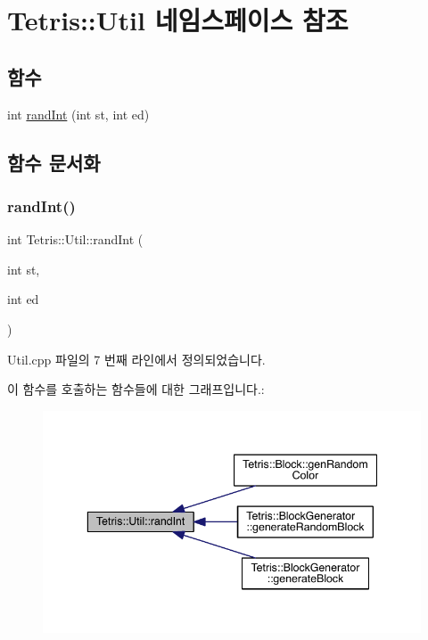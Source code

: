 \hypertarget{namespace_tetris_1_1_util}{}\section{Tetris\+:\+:Util 네임스페이스 참조}
\label{namespace_tetris_1_1_util}
\subsection*{함수}
\begin{DoxyCompactItemize}
\item 
int \hyperlink{namespace_tetris_1_1_util_aa590e9fd847ac6e0c9bc6bf464b5a74b}{rand\+Int} (int st, int ed)
\end{DoxyCompactItemize}


\subsection{함수 문서화}
\mbox{\label{namespace_tetris_1_1_util_aa590e9fd847ac6e0c9bc6bf464b5a74b}} 
\subsubsection{\texorpdfstring{rand\+Int()}{randInt()}}
{\footnotesize\ttfamily int Tetris\+::\+Util\+::rand\+Int (\begin{DoxyParamCaption}\item[{int}]{st,  }\item[{int}]{ed }\end{DoxyParamCaption})}



Util.\+cpp 파일의 7 번째 라인에서 정의되었습니다.

이 함수를 호출하는 함수들에 대한 그래프입니다.\+:
\nopagebreak
\begin{figure}[H]
\begin{center}
\leavevmode
\includegraphics[width=344pt]{namespace_tetris_1_1_util_aa590e9fd847ac6e0c9bc6bf464b5a74b_icgraph}
\end{center}
\end{figure}
